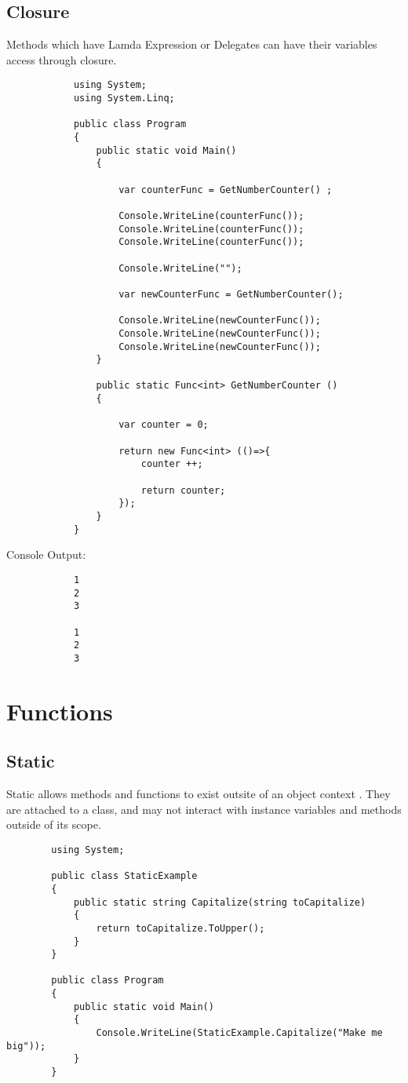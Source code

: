 \documentclass {amsart}
\begin{document}
		\subsection {Closure} Methods which have Lamda Expression or Delegates can have their variables access through closure.
			\begin{lstlisting}
			using System;
			using System.Linq;

			public class Program
			{
				public static void Main()
				{

					var counterFunc = GetNumberCounter() ;

					Console.WriteLine(counterFunc());
					Console.WriteLine(counterFunc());
					Console.WriteLine(counterFunc());
					
					Console.WriteLine("");
					
					var newCounterFunc = GetNumberCounter();
					
					Console.WriteLine(newCounterFunc());
					Console.WriteLine(newCounterFunc());
					Console.WriteLine(newCounterFunc());
				}
				
				public static Func<int> GetNumberCounter () 
				{
					
					var counter = 0; 
					
					return new Func<int> (()=>{
						counter ++;
						
						return counter;
					});
				}
			}
			\end{lstlisting}
			Console Output: 
			\begin{verbatim}
			1
			2
			3

			1
			2
			3
			\end{verbatim}
	
\section{Functions}


	\subsection{Static}  Static allows methods and functions to exist outsite of an object context . They are attached to a class, and may not interact with instance variables and methods outside of its scope.  
		\begin{lstlisting}
		using System;

		public class StaticExample 
		{
			public static string Capitalize(string toCapitalize)
			{
				return toCapitalize.ToUpper();
			}
		}

		public class Program
		{
			public static void Main()
			{
				Console.WriteLine(StaticExample.Capitalize("Make me big"));
			}
		}

		\end{lstlisting}
\end{document}
